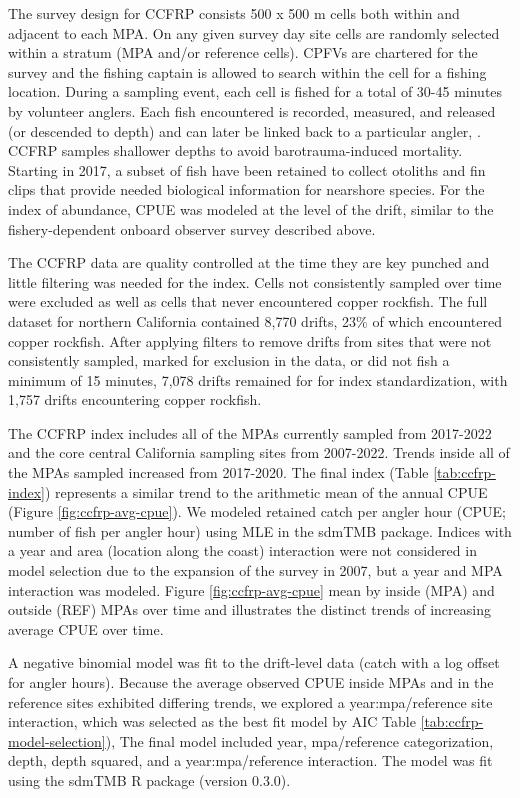 \documentclass[11pt,
  letterpaper,
]{article}
\begin{document}
The survey design for CCFRP consists 500 x 500 m cells both within and adjacent to each MPA. On any given survey day site cells are randomly selected within a stratum (MPA and/or reference cells). CPFVs are chartered for the survey and the fishing captain is allowed to search within the cell for a fishing location. During a sampling event, each cell is fished for a total of 30-45 minutes by volunteer anglers. Each fish encountered is recorded, measured, and released (or descended to depth) and can later be linked back to a particular angler, . CCFRP samples shallower depths to avoid barotrauma-induced mortality.\\
Starting in 2017, a subset of fish have been retained to collect otoliths and fin clips that provide needed biological information for nearshore species. For the index of abundance, CPUE was modeled at the level of the drift, similar to the fishery-dependent onboard observer survey described above.

The CCFRP data are quality controlled at the time they are key punched and little filtering was needed for the index. Cells not consistently sampled over time were excluded as well as cells that never encountered copper rockfish. The full dataset for northern California contained 8,770 drifts, 23\% of which encountered copper rockfish. After applying filters to remove drifts from sites that were not consistently sampled, marked for exclusion in the data, or did not fish a minimum of 15 minutes, 7,078 drifts remained for for index standardization, with 1,757 drifts encountering copper rockfish.

The CCFRP index includes all of the MPAs currently sampled from 2017-2022 and the core central California sampling sites from 2007-2022. Trends inside all of the MPAs sampled increased from 2017-2020. The final index (Table \ref{tab:ccfrp-index}) represents a similar trend to the arithmetic mean of the annual CPUE (Figure \ref{fig:ccfrp-avg-cpue}). We modeled retained catch per angler hour (CPUE; number of fish per angler hour) using MLE in the sdmTMB package. Indices with a year and area (location along the coast) interaction were not considered in model selection due to the expansion of the survey in 2007, but a year and MPA interaction was modeled. Figure \ref{fig:ccfrp-avg-cpue} mean by inside (MPA) and outside (REF) MPAs over time and illustrates the distinct trends of increasing average CPUE over time.

A negative binomial model was fit to the drift-level data (catch with a log offset for angler hours). Because the average observed CPUE inside MPAs and in the reference sites exhibited differing trends, we explored a year:mpa/reference site interaction, which was selected as the best fit model by AIC Table \ref{tab:ccfrp-model-selection}), The final model included year, mpa/reference categorization, depth, depth squared, and a year:mpa/reference interaction. The model was fit using the sdmTMB R package (version 0.3.0).
\end{document}
